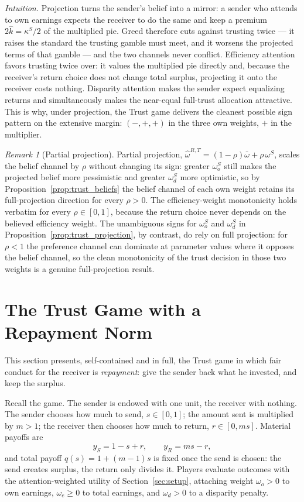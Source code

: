 \documentclass[11pt]{article}
\theoremstyle{plain}
\theoremstyle{remark}
\newtheorem{remark}{Remark}
\begin{document}
\noindent\emph{Intuition.}  Projection turns the sender's belief into a mirror: a sender who attends to own earnings expects the receiver to do the same and keep a premium $2\hat k=\kappa^S/2$ of the multiplied pie.  Greed therefore cuts against trusting twice --- it raises the standard the trusting gamble must meet, and it worsens the projected terms of that gamble --- and the two channels never conflict.  Efficiency attention favors trusting twice over: it values the multiplied pie directly and, because the receiver's return choice does not change total surplus, projecting it onto the receiver costs nothing.  Disparity attention makes the sender expect equalizing returns and simultaneously makes the near-equal full-trust allocation attractive.  This is why, under projection, the Trust game delivers the cleanest possible sign pattern on the extensive margin: $(-,+,+)$ in the three own weights, $+$ in the multiplier.

\begin{remark}[Partial projection]
Partial projection, $\hat\omega^{R,T}=(1-\rho)\bar\omega+\rho\,\omega^S$, scales the belief channel by $\rho$ without changing its sign: greater $\omega_o^S$ still makes the projected belief more pessimistic and greater $\omega_d^S$ more optimistic, so by Proposition~\ref{prop:trust_beliefs} the belief channel of each own weight retains its full-projection direction for every $\rho>0$.  The efficiency-weight monotonicity holds verbatim for every $\rho\in[0,1]$, because the return choice never depends on the believed efficiency weight.  The unambiguous signs for $\omega_o^S$ and $\omega_d^S$ in Proposition~\ref{prop:trust_projection}, by contrast, do rely on full projection: for $\rho<1$ the preference channel can dominate at parameter values where it opposes the belief channel, so the clean monotonicity of the trust decision in those two weights is a genuine full-projection result.
\end{remark}

\clearpage

\section{The Trust Game with a Repayment Norm}
\label{sec:norm_repay}

This section presents, self-contained and in full, the Trust game in which fair conduct for the receiver is \emph{repayment}: give the sender back what he invested, and keep the surplus.

Recall the game.  The sender is endowed with one unit, the receiver with nothing.  The sender chooses how much to send, $s\in[0,1]$; the amount sent is multiplied by $m>1$; the receiver then chooses how much to return, $r\in[0,ms]$.  Material payoffs are
\[
        y_S=1-s+r,
        \qquad
        y_R=ms-r,
\]
and total payoff $q(s)=1+(m-1)s$ is fixed once the send is chosen: the send creates surplus, the return only divides it.  Players evaluate outcomes with the attention-weighted utility of Section~\ref{sec:setup}, attaching weight $\omega_o>0$ to own earnings, $\omega_e\ge0$ to total earnings, and $\omega_d>0$ to a disparity penalty.
\end{document}
